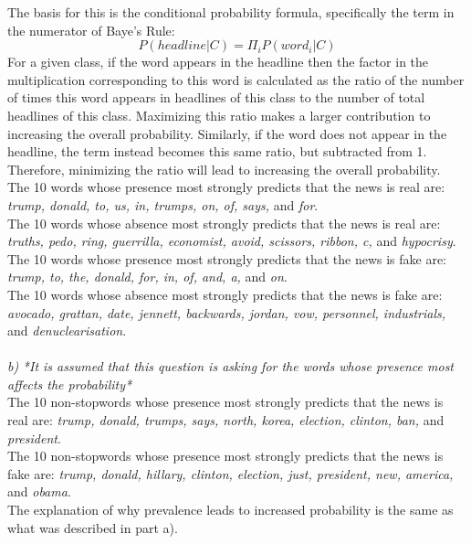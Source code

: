 \documentclass{article}
\begin{document}
The basis for this is the conditional probability formula, specifically the term in the numerator of Baye's Rule:
$$P(headline|C)=\Pi_{i}P(word_i|C)$$
For a given class, if the word appears in the headline then the factor in the multiplication corresponding to this word is calculated as the ratio of the number of times this word appears in headlines of this class to the number of total headlines of this class. Maximizing this ratio makes a larger contribution to increasing the overall probability. Similarly, if the word does not appear in the headline, the term instead becomes this same ratio, but subtracted from 1. Therefore, minimizing the ratio will lead to increasing the overall probability.\\

The 10 words whose presence most strongly predicts that the news is real are: \textit{trump, donald, to, us, in, trumps, on, of, says,} and \textit{for}.\\

The 10 words whose absence most strongly predicts that the news is real are: \textit{truths, pedo, ring, guerrilla, economist, avoid, scissors, ribbon, c,} and \textit{hypocrisy}.\\

The 10 words whose presence most strongly predicts that the news is fake are: \textit{trump, to, the, donald, for, in, of, and, a,} and \textit{on}.\\

The 10 words whose absence most strongly predicts that the news is fake are: \textit{avocado, grattan, date, jennett, backwards, jordan, vow, personnel, industrials,} and \textit{denuclearisation}.\\\\
\textit{b)} \textit{*It is assumed that this question is asking for the words whose presence most affects the probability*}\\

The 10 non-stopwords whose presence most strongly predicts that the news is real are: \textit{trump, donald, trumps, says, north, korea, election, clinton, ban,} and \textit{president}.\\

The 10 non-stopwords whose presence most strongly predicts that the news is fake are: \textit{trump, donald, hillary, clinton, election, just, president, new, america,} and \textit{obama}.\\

The explanation of why prevalence leads to increased probability is the same as what was described in part a).\\
\end{document}
